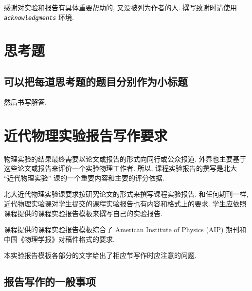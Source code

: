 \documentclass[font=fandol]{mpltx}
\newcommand{\note}[1]{{\color{gray}#1}}
\newcommand*\env[1]{\textit{\texttt{#1}}}
\begin{document}
\begin{acknowledgments}
	感谢对实验和报告有具体重要帮助的, 又没被列为作者的人.
	\note{撰写致谢时请使用 \env{acknowledgments} 环境.}
\end{acknowledgments}



\clearpage %
\appendix %
\section{思考题}\label{app:exercise}
\subsection{可以把每道思考题的题目分别作为小标题}
然后书写解答.

\section{近代物理实验报告写作要求}

物理实验的结果最终需要以论文或报告的形式向同行或公众报道.
外界也主要基于这些论文或报告来评价一个实验物理工作者.
所以, 课程实验报告的撰写是北大 ``近代物理实验'' 课的一个重要内容和主要的评分依据.

北大近代物理实验课要求按研究论文的形式来撰写课程实验报告.
和任何期刊一样, 近代物理实验课对学生提交的课程实验报告也有内容和格式上的要求.
学生应依照课程提供的课程实验报告模板来撰写自己的实验报告.

课程提供的课程实验报告模板综合了 American Institute of Physics (AIP) 期刊和中国《物理学报》对稿件格式的要求.

本实验报告模板各部分的文字给出了相应节写作时应注意的问题.

\subsection*{报告写作的一般事项}
\end{document}
